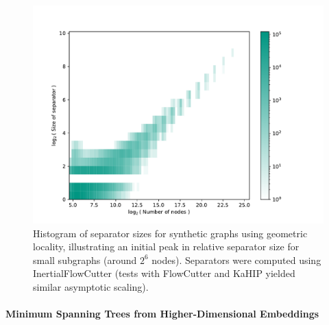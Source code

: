 \begin{figure}[tbhp]
	\centering
	\includegraphics[width=0.6\linewidth]{graphics/local_embedding-hist.pdf}
	\caption{Histogram of separator sizes for synthetic graphs using geometric locality, illustrating an initial peak in relative separator size for small subgraphs (around \(2^6\) nodes). Separators were computed using InertialFlowCutter (tests with FlowCutter and KaHIP yielded similar asymptotic scaling).}
	\label{fig:local_embedding_hist_deviation}
\end{figure}




\paragraph{Minimum Spanning Trees from Higher-Dimensional Embeddings}
\label{sec:synthetic:mst}

